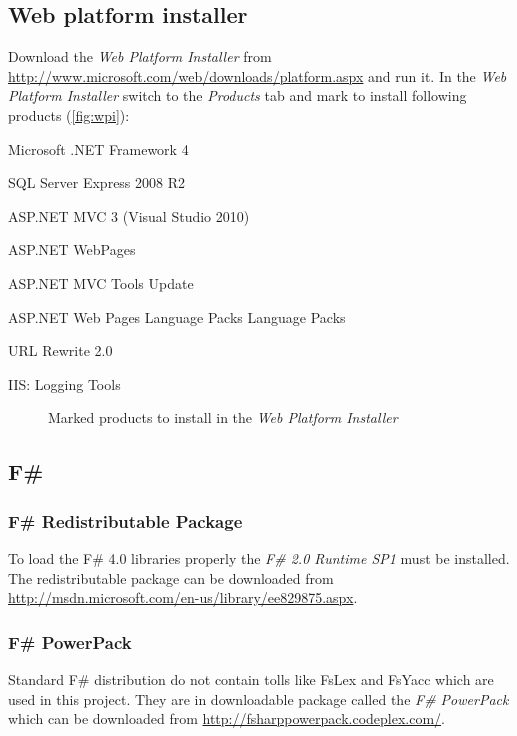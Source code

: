 \subsection{Web platform installer}

Download the \emph{Web Platform Installer} from \url{http://www.microsoft.com/web/downloads/platform.aspx} and run it.
In the \emph{Web Platform Installer} switch to the \emph{Products} tab and mark to install following products (\autoref{fig:wpi}):
\begin{itemize*}
	\item Microsoft .NET Framework 4
	\item SQL Server Express 2008 R2
	\item ASP.NET MVC 3 (Visual Studio 2010)
	\item ASP.NET WebPages
	\item ASP.NET MVC Tools Update
	\item ASP.NET Web Pages Language Packs Language Packs
	\item URL Rewrite 2.0
	\item IIS: Logging Tools
\end{itemize*}

\begin{figure}[h!]
	\centering
	\caption{Marked products to install in the \emph{Web Platform Installer}}
\end{figure}
		
		

\subsection{F\#}

\subsubsection{F\# Redistributable Package}

To load the F\# 4.0 libraries properly the \emph{F\# 2.0 Runtime SP1} must be installed.
The redistributable package can be downloaded from \url{http://msdn.microsoft.com/en-us/library/ee829875.aspx}.

\subsubsection{F\# PowerPack}

Standard F\# distribution do not contain tolls like FsLex and FsYacc which are used in this project.
They are in downloadable package called the \emph{F\# PowerPack} which can be downloaded from \url{http://fsharppowerpack.codeplex.com/}.



